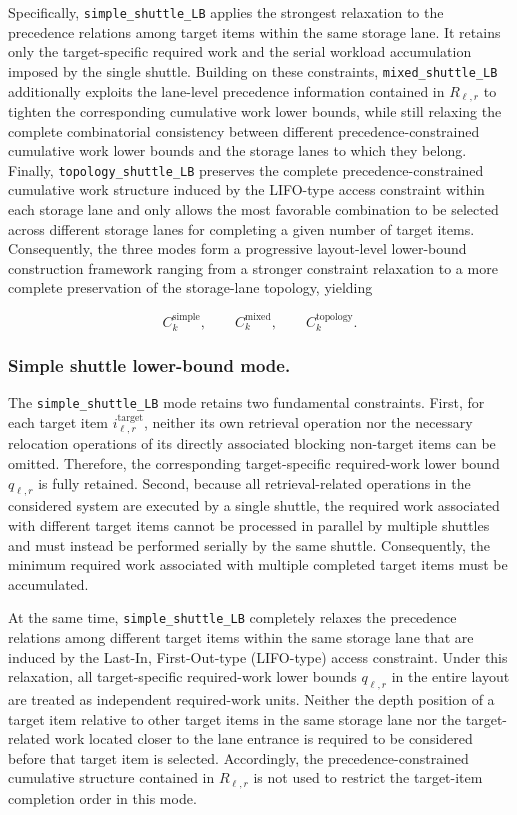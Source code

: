Specifically, \texttt{simple\_shuttle\_LB} applies the strongest relaxation to
the precedence relations among target items within the same storage lane. It
retains only the target-specific required work and the serial workload
accumulation imposed by the single shuttle. Building on these constraints,
\texttt{mixed\_shuttle\_LB} additionally exploits the lane-level precedence
information contained in \(R_{\ell,r}\) to tighten the corresponding cumulative
work lower bounds, while still relaxing the complete combinatorial consistency
between different precedence-constrained cumulative work lower bounds and the
storage lanes to which they belong. Finally,
\texttt{topology\_shuttle\_LB} preserves the complete
precedence-constrained cumulative work structure induced by the LIFO-type
access constraint within each storage lane and only allows the most favorable
combination to be selected across different storage lanes for completing a
given number of target items. Consequently, the three modes form a progressive
layout-level lower-bound construction framework ranging from a stronger
constraint relaxation to a more complete preservation of the storage-lane
topology, yielding

\[
C_k^{\mathrm{simple}},
\qquad
C_k^{\mathrm{mixed}},
\qquad
C_k^{\mathrm{topology}}.
\]

\subsubsection{Simple shuttle lower-bound mode.}

The \texttt{simple\_shuttle\_LB} mode retains two
fundamental constraints. First, for each target item
\(i^{\mathrm{target}}_{\ell,r}\), neither its own retrieval operation nor the
necessary relocation operations of its directly associated blocking non-target
items can be omitted. Therefore, the corresponding target-specific
required-work lower bound \(q_{\ell,r}\) is fully retained. Second, because all
retrieval-related operations in the considered system are executed by a single
shuttle, the required work associated with different target items cannot be
processed in parallel by multiple shuttles and must instead be performed
serially by the same shuttle. Consequently, the minimum required work
associated with multiple completed target items must be accumulated.

At the same time, \texttt{simple\_shuttle\_LB} completely relaxes the
precedence relations among different target items within the same storage lane
that are induced by the Last-In, First-Out-type (LIFO-type) access constraint.
Under this relaxation, all target-specific required-work lower bounds
\(q_{\ell,r}\) in the entire layout are treated as independent required-work
units. Neither the depth position of a target item relative to other target
items in the same storage lane nor the target-related work located closer to
the lane entrance is required to be considered before that target item is
selected. Accordingly, the precedence-constrained cumulative structure
contained in \(R_{\ell,r}\) is not used to restrict the target-item completion
order in this mode.


